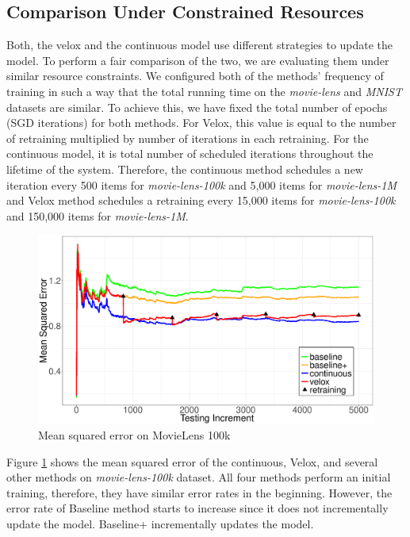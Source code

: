 \documentclass{vldb}
\begin{document}
\subsection{Comparison Under Constrained Resources }
Both, the velox and the continuous model use different strategies to update the model.
To perform a fair comparison of the two, we are evaluating them under similar resource constraints.
We configured both of the methods' frequency of training in such a way that the total running time on the \textit{movie-lens} and \textit{MNIST} datasets are similar.
To achieve this, we have fixed the total number of epochs (SGD iterations) for both methods.
For Velox, this value is equal to the number of retraining multiplied by number of iterations in each retraining. 
For the continuous model, it is total number of scheduled iterations throughout the lifetime of the system.
Therefore, the continuous method schedules a new iteration every 500 items for \textit{movie-lens-100k} and 5,000 items for \textit{movie-lens-1M} and Velox method schedules a retraining every 15,000 items for \textit{movie-lens-100k} and 150,000 items for \textit{movie-lens-1M}.
\begin{figure}[h]
\centering
\includegraphics[width=\columnwidth]{../images/experiment-results/movie-lens-100k-quality-improved.eps}
\caption{Mean squared error on MovieLens 100k}
\label{fig:movie-lens-100k-score}
\end{figure}
Figure \ref{fig:movie-lens-100k-score} shows the mean squared error of the continuous, Velox, and several other methods on \textit{movie-lens-100k} dataset.
All four methods perform an initial training, therefore, they have similar error rates in the beginning.
However, the error rate of Baseline method starts to increase since it does not incrementally update the model.
Baseline+ incrementally updates the model.
\end{document}
